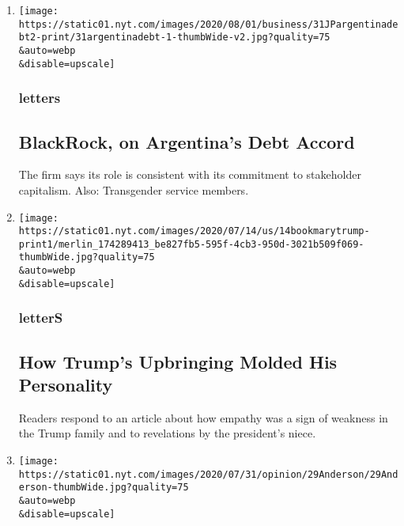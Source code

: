 \begin{enumerate}
\def\labelenumi{\arabic{enumi}.}
\item
  \href{/2020/08/04/opinion/letters/blackrock-argentina.html}{}

  \texttt{[image: https://static01.nyt.com/images/2020/08/01/business/31JPargentinadebt2-print/31argentinadebt-1-thumbWide-v2.jpg?quality=75\\\&auto=webp\\\&disable=upscale]}

  \hypertarget{letters}{%
  \subsubsection{letters}\label{letters}}

  \hypertarget{blackrock-on-argentinas-debt-accord}{%
  \subsection{BlackRock, on Argentina's Debt
  Accord}\label{blackrock-on-argentinas-debt-accord}}

  The firm says its role is consistent with its commitment to
  stakeholder capitalism. Also: Transgender service members.
\item
  \href{/2020/08/04/opinion/letters/trump-family.html}{}

  \texttt{[image: https://static01.nyt.com/images/2020/07/14/us/14bookmarytrump-print1/merlin\_174289413\_be827fb5-595f-4cb3-950d-3021b509f069-thumbWide.jpg?quality=75\\\&auto=webp\\\&disable=upscale]}

  \hypertarget{letters-1}{%
  \subsubsection{letterS}\label{letters-1}}

  \hypertarget{how-trumps-upbringing-molded-his-personality}{%
  \subsection{How Trump's Upbringing Molded His
  Personality}\label{how-trumps-upbringing-molded-his-personality}}

  Readers respond to an article about how empathy was a sign of weakness
  in the Trump family and to revelations by the president's niece.
\item
  \href{/2020/08/03/opinion/letters/nuclear-arms-treaty.html}{}

  \texttt{[image: https://static01.nyt.com/images/2020/07/31/opinion/29Anderson/29Anderson-thumbWide.jpg?quality=75\\\&auto=webp\\\&disable=upscale]}


\end{enumerate}
